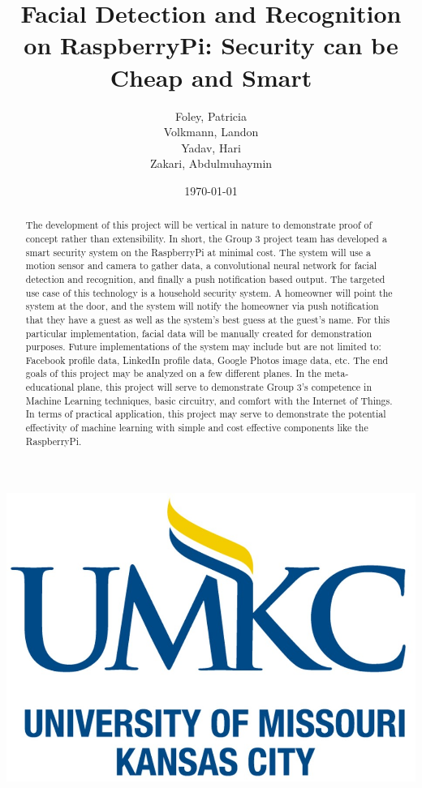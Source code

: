 \documentclass[11pt]{article}
\title{Facial Detection and Recognition on RaspberryPi: Security can be Cheap and Smart}
\author{Foley, Patricia\\Volkmann, Landon \\Yadav, Hari\\Zakari, Abdulmuhaymin}
\date{\today}
\begin{document}
\makeatletter
    \begin{titlepage}
        \begin{center}
            \includegraphics[width=0.7\linewidth]{UMKC.jpg}\\[4ex]
            {\huge \bfseries  \@title }\\[2ex] 
            {\LARGE  \@author}\\[30ex] 
            {\large \@date}
        \end{center}
    \end{titlepage}
\makeatother
\thispagestyle{empty}
\newpage

\thispagestyle{empty}
\newpage

\maketitle
\setcounter{page}{1} %

\begin{abstract}
The development of this project will be vertical in nature to demonstrate proof of concept rather than extensibility. In short, the Group 3 project team has developed a smart security system on the RaspberryPi at minimal cost. 
The system will use a motion sensor and camera to gather data, a convolutional neural network for facial detection and recognition, and finally a push notification based output. The targeted use case of this technology is a household security system. A homeowner will point the system at the door, and the system will notify the homeowner via push notification that they have a guest as well as the system’s best guess at the guest’s name. For this particular implementation, facial data will be manually created for demonstration purposes. Future implementations of the system may include but are not limited to: Facebook profile data, LinkedIn profile data, Google Photos image data, etc.
The end goals of this project may be analyzed on a few different planes. In the meta-educational plane, this project will serve to demonstrate Group 3’s competence in Machine Learning techniques, basic circuitry, and comfort with the Internet of Things. In terms of practical application, this project may serve to demonstrate the potential effectivity of machine learning with simple and cost effective components like the RaspberryPi.  

\end{abstract}
\end{document}
